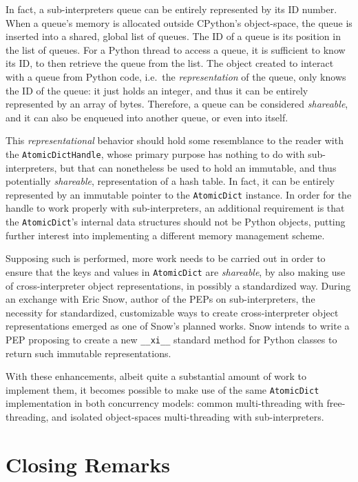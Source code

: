 In fact, a sub-interpreters queue can be entirely represented by its ID number.
When a queue's memory is allocated outside CPython's object-space, the queue is inserted into a shared, global list of queues.
The ID of a queue is its position in the list of queues.
For a Python thread to access a queue, it is sufficient to know its ID, to then retrieve the queue from the list.
The object created to interact with a queue from Python code, i.e.\ the \emph{representation} of the queue, only knows the ID of the queue: it just holds an integer, and thus it can be entirely represented by an array of bytes.
Therefore, a queue can be considered \emph{shareable}, and it can also be enqueued into another queue, or even into itself.

This \emph{representational} behavior should hold some resemblance to the reader with the \texttt{AtomicDictHandle}, whose primary purpose has nothing to do with sub-interpreters, but that can nonetheless be used to hold an immutable, and thus potentially \emph{shareable}, representation of a hash table.
In fact, it can be entirely represented by an immutable pointer to the \texttt{AtomicDict} instance.
In order for the handle to work properly with sub-interpreters, an additional requirement is that the \texttt{AtomicDict}'s internal data structures should not be Python objects, putting further interest into implementing a different memory management scheme.

Supposing such is performed, more work needs to be carried out in order to ensure that the keys and values in \texttt{AtomicDict} are \emph{shareable}, by also making use of cross-interpreter object representations, in possibly a standardized way.
During an exchange with Eric Snow, author of the PEPs on sub-interpreters, the necessity for standardized, customizable ways to create cross-interpreter object representations emerged as one of Snow's planned works.
Snow intends to write a PEP proposing to create a new \texttt{\_\_xi\_\_} standard method for Python classes to return such immutable representations.

With these enhancements, albeit quite a substantial amount of work to implement them, it becomes possible to make use of the same \texttt{AtomicDict} implementation in both concurrency models: common multi-threading with free-threading, and isolated object-spaces multi-threading with sub-interpreters.


\section{Closing Remarks}\label{sec:closing-remarks}


